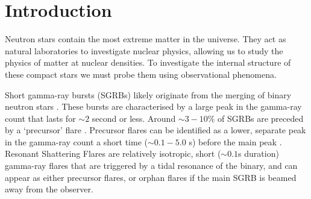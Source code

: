 \documentclass[fleqn,usenatbib]{mnras}
\begin{document}



 


\section{Introduction}
\hspace{\parindent}
 
Neutron stars contain the most extreme matter in the universe. They act as natural laboratories to investigate nuclear physics, allowing us to study the physics of matter at nuclear densities. To investigate the internal structure of these compact stars we must probe them using observational phenomena.

Short gamma-ray bursts (SGRBs) \citep{kouveliotou1993identification,d2015short} likely originate from the merging of binary neutron stars \citep{eichler1989nucleosynthesis,fong2009hubble}. These bursts are characterised by a large peak in the gamma-ray count that lasts for $\sim 2$ second or less. Around $\sim3-10$\% of SGRBs are preceded by a `precursor' flare \citep{zhong2019precursors,troja2010precursors}. 
Precursor flares can be identified as a lower, separate peak in the gamma-ray count a short time ($\sim 0.1-5.0$ s) before the main peak \citep{zhong2019precursors}. 
Resonant Shattering Flares \citep{tsang2012resonant} are relatively isotropic, short ($\sim 0.1$s duration) gamma-ray flares that are triggered by a tidal resonance of the binary, and can appear as either precursor flares, or orphan flares if the main SGRB is beamed away from the observer. 
\end{document}

